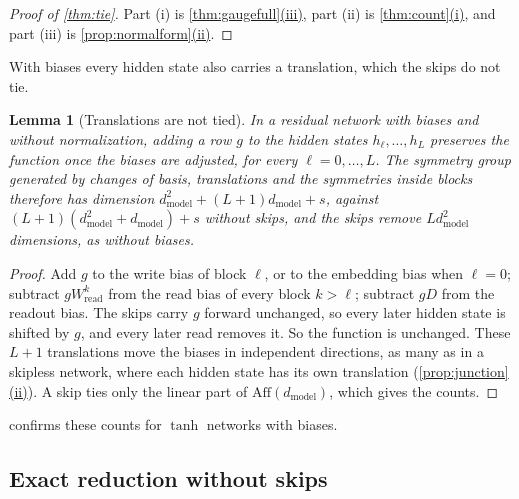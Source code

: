 \documentclass[10pt]{article}
\newtheorem{lemma}[theorem]{Lemma}
\theoremstyle{definition}
\theoremstyle{remark}
\newcommand{\Wread}{W_{\mathrm{read}}}
\newcommand{\dm}{d_{\mathrm{model}}}
\newcommand{\Aff}{\mathrm{Aff}}
\DeclareRobustCommand{\cpref}[2]{\hyperref[#1:#2]{\cref*{#1}(#2)}}
\begin{document}
\thmTie*

\begin{proof}[Proof of \cref{thm:tie}]
Part (i) is \cpref{thm:gaugefull}{iii}, part (ii) is \cpref{thm:count}{i}, and part (iii) is \cpref{prop:normalform}{ii}.
\end{proof}

With biases every hidden state also carries a translation, which the skips do not tie.

\begin{lemma}[Translations are not tied]\label{lem:translations}
In a residual network with biases and without normalization, adding a row $g$ to the hidden states $h_\ell, \dots, h_L$ preserves the function once the biases are adjusted, for every $\ell = 0, \dots, L$. The symmetry group generated by changes of basis, translations and the symmetries inside blocks therefore has dimension $\dm^2 + (L+1)\dm + s$, against $(L+1)(\dm^2 + \dm) + s$ without skips, and the skips remove $L\dm^2$ dimensions, as without biases.
\end{lemma}

\begin{proof}
Add $g$ to the write bias of block $\ell$, or to the embedding bias when $\ell = 0$; subtract $g\Wread^{k}$ from the read bias of every block $k > \ell$; subtract $gD$ from the readout bias. The skips carry $g$ forward unchanged, so every later hidden state is shifted by $g$, and every later read removes it. So the function is unchanged. These $L + 1$ translations move the biases in independent directions, as many as in a skipless network, where each hidden state has its own translation (\cpref{prop:junction}{ii}). A skip ties only the linear part of $\Aff(\dm)$, which gives the counts.
\end{proof}

 confirms these counts for $\tanh$ networks with biases.


\subsection{Exact reduction without skips}\label{app:prf-normalform}
\end{document}
